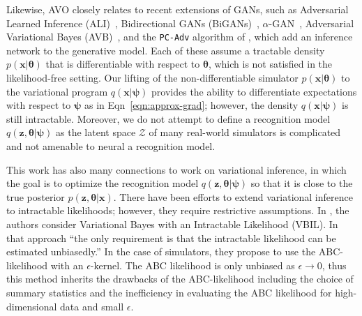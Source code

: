 \documentclass[twocolumn,superscriptaddress,aps]{revtex4-1}
\newcommand{\bftheta}{{\bm \theta}}
\newcommand{\bfpsi}{{\bm \psi}}
\newcommand{\bfx}{\mathbf{x}}
\newcommand{\bfz}{\mathbf{z}}
\theoremstyle{plain}
\begin{document}
Likewise, AVO closely relates to recent extensions of GANs, such as
Adversarial Learned Inference (ALI)~\citep{dumoulin2016adversarially},
Bidirectional GANs (BiGANs)~\citep{donahue2016adversarial},
$\alpha$-GAN~\citep{rosca2017variational}, Adversarial Variational Bayes
(AVB)~\citep{DBLP:journals/corr/MeschederNG17}, and the \texttt{PC-Adv}
algorithm of  \citep{2017arXiv170208235H}, which
add an inference network to the generative model.  Each of these assume a
tractable density $p(\bfx|\bftheta)$ that is differentiable with respect to
$\bftheta$, which is  not satisfied in the likelihood-free setting. Our lifting
of the non-differentiable simulator $p(\bfx|\bftheta)$ to the variational
program $q(\bfx | \bfpsi)$ provides the ability to differentiate expectations
with respect to $\bfpsi$ as in Eqn~\ref{eqn:approx-grad}; however, the density
$q(\bfx | \bfpsi)$ is still intractable. Moreover, we do not attempt to define a
recognition model  $q(\bfz, \bftheta|\bfpsi)$ as the latent space $\mathcal{Z}$
of many real-world simulators is complicated and not amenable to neural a
recognition model.

This work has also many connections to work on variational inference, in which the
goal is to optimize the recognition model $q(\bfz, \bftheta|\bfpsi)$ so that it
is close to the true posterior $p(\bfz, \bftheta |\mathbf{x})$. There have been efforts
to extend variational inference to intractable likelihoods; however, they
require restrictive assumptions.  In \citep{tran2017variational}, the authors
consider Variational Bayes with an Intractable Likelihood (VBIL). In that
approach ``the only requirement is that the intractable likelihood can be
estimated unbiasedly.'' In the case of simulators, they propose to use the
ABC-likelihood with an $\epsilon$-kernel. The ABC likelihood is only unbiased as
$\epsilon \to 0$,   thus this method inherits the drawbacks of the ABC-likelihood
including the choice of summary statistics and the inefficiency in evaluating
the ABC likelihood for high-dimensional data and small $\epsilon$.
\end{document}
